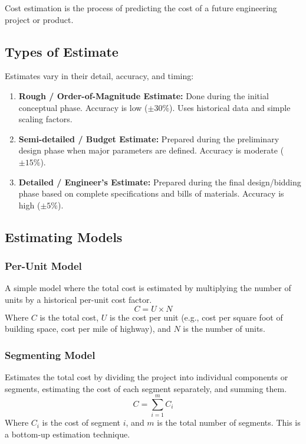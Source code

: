 \documentclass[12pt,a4paper]{article}
\begin{document}
Cost estimation is the process of predicting the cost of a future engineering project or product.

\subsection{Types of Estimate}
Estimates vary in their detail, accuracy, and timing:
\begin{enumerate}[label=\textbf{\arabic*.}, leftmargin=*, itemsep=3pt, topsep=2pt]
  \item \textbf{Rough / Order-of-Magnitude Estimate:} Done during the initial conceptual phase. Accuracy is low ($\pm 30\%$). Uses historical data and simple scaling factors.
  \item \textbf{Semi-detailed / Budget Estimate:} Prepared during the preliminary design phase when major parameters are defined. Accuracy is moderate ($\pm 15\%$).
  \item \textbf{Detailed / Engineer's Estimate:} Prepared during the final design/bidding phase based on complete specifications and bills of materials. Accuracy is high ($\pm 5\%$).
\end{enumerate}

\subsection{Estimating Models}

\subsubsection{Per-Unit Model}
A simple model where the total cost is estimated by multiplying the number of units by a historical per-unit cost factor.
\begin{equation}
  C = U \times N
\end{equation}
Where $C$ is the total cost, $U$ is the cost per unit (e.g., cost per square foot of building space, cost per mile of highway), and $N$ is the number of units.

\subsubsection{Segmenting Model}
Estimates the total cost by dividing the project into individual components or segments, estimating the cost of each segment separately, and summing them.
\begin{equation}
  C = \sum_{i=1}^{m} C_i
\end{equation}
Where $C_i$ is the cost of segment $i$, and $m$ is the total number of segments. This is a bottom-up estimation technique.
\end{document}
